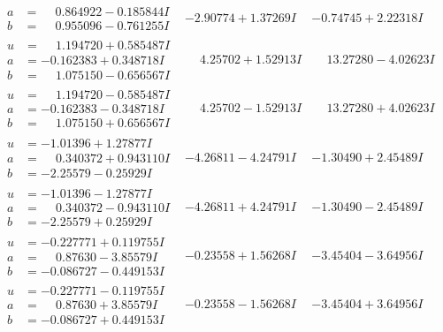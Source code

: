 \documentclass[1p]{elsarticle_modified}
\theoremstyle{definition}
\begin{document}
$$\begin{array}{c|c|c}
\begin{aligned}
a &= \phantom{-}0.864922 - 0.185844 I \\
b &= \phantom{-}0.955096 - 0.761255 I\end{aligned}
 & -2.90774 + 1.37269 I & -0.74745 + 2.22318 I \\ \hline\begin{aligned}
u &= \phantom{-}1.194720 + 0.585487 I \\
a &= -0.162383 + 0.348718 I \\
b &= \phantom{-}1.075150 - 0.656567 I\end{aligned}
 & \phantom{-}4.25702 + 1.52913 I & \phantom{-}13.27280 - 4.02623 I \\ \hline\begin{aligned}
u &= \phantom{-}1.194720 - 0.585487 I \\
a &= -0.162383 - 0.348718 I \\
b &= \phantom{-}1.075150 + 0.656567 I\end{aligned}
 & \phantom{-}4.25702 - 1.52913 I & \phantom{-}13.27280 + 4.02623 I \\ \hline\begin{aligned}
u &= -1.01396 + 1.27877 I \\
a &= \phantom{-}0.340372 + 0.943110 I \\
b &= -2.25579 - 0.25929 I\end{aligned}
 & -4.26811 - 4.24791 I & -1.30490 + 2.45489 I \\ \hline\begin{aligned}
u &= -1.01396 - 1.27877 I \\
a &= \phantom{-}0.340372 - 0.943110 I \\
b &= -2.25579 + 0.25929 I\end{aligned}
 & -4.26811 + 4.24791 I & -1.30490 - 2.45489 I \\ \hline\begin{aligned}
u &= -0.227771 + 0.119755 I \\
a &= \phantom{-}0.87630 - 3.85579 I \\
b &= -0.086727 - 0.449153 I\end{aligned}
 & -0.23558 + 1.56268 I & -3.45404 - 3.64956 I \\ \hline\begin{aligned}
u &= -0.227771 - 0.119755 I \\
a &= \phantom{-}0.87630 + 3.85579 I \\
b &= -0.086727 + 0.449153 I\end{aligned}
 & -0.23558 - 1.56268 I & -3.45404 + 3.64956 I \\ \hline\begin{aligned}

\end{aligned}
\end{array}$$
\end{document}
